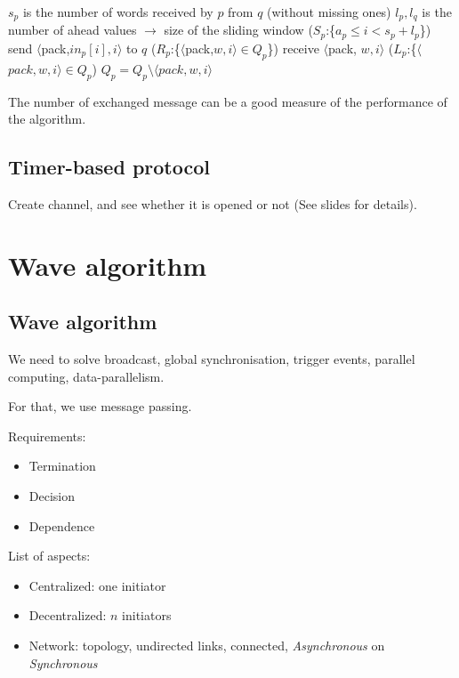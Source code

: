 \documentclass{article}
\newcommand\tok[1]{$\langle$#1$\rangle$}
\begin{document}
\begin{algorithm}
\Var
$s_p$ is the number of words received by $p$ from $q$ (without missing ones)\;
$l_p, l_q$ is the number of ahead values $\to$ size of the sliding window\;
\Label($S_p$:\{$a_p\leq i < s_p+l_p$\}){
	send \tok{pack,$in_p[i],i$} to $q$\;
}
\Label($R_p$:\{\tok{pack,$w,i$}$\in Q_p$\}){
	receive \tok{pack, $w,i$}\;
}
\Label($L_p$:\{\tok{$pack,w,i$}$\in Q_p$){
	$Q_p=Q_p\setminus$\tok{$pack,w,i$}\;
}
\end{algorithm}

The number of exchanged message can be a good measure of the performance of the algorithm.
\clearpage

\subsection{Timer-based protocol}

Create channel, and see whether it is opened or not (See slides for details).


\section{Wave algorithm}
\subsection{Wave algorithm}
We need to solve broadcast, global synchronisation, trigger events, parallel computing, data-parallelism.

For that, we use message passing.

Requirements:
\begin{itemize}[noitemsep]
\item Termination
\item Decision
\item Dependence
\end{itemize}
\bigskip

List of aspects:
\begin{itemize}[noitemsep]
\item Centralized: one initiator
\item Decentralized: $n$ initiators
\item Network: topology, undirected links, connected, \emph{Asynchronous} on \emph{Synchronous}
\end{itemize}
\bigskip
\end{document}
